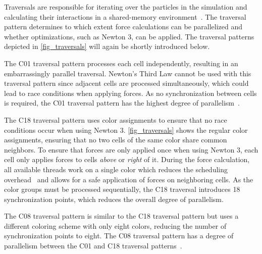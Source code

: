\documentclass[conference]{IEEEtran}
\begin{document}
\begin{description}[style=nextline]
    \item[Traversal]
        Traversals are responsible for iterating over the particles in the simulation and calculating their interactions in a shared-memory environment~\cite{SECKLER2021101296}. The traversal pattern determines to which extent force calculations can be parallelized and whether optimizations, such as Newton 3, can be applied. The traversal patterns depicted in \autoref{fig_traversals} will again be shortly introduced below.

        \begin{description}[style=nextline, font=\itshape\mdseries]
            \item[$\bullet$ C01]
                The C01 traversal pattern processes each cell independently, resulting in an embarrassingly parallel traversal. Newton's Third Law cannot be used with this traversal pattern since adjacent cells are processed simultaneously, which could lead to race conditions when applying forces. As no synchronization between cells is required, the C01 traversal pattern has the highest degree of parallelism~\cite{NEWCOME2023115278}.
            \item[$\bullet$ C18]
                The C18 traversal pattern uses color assignments to ensure that no race conditions occur when using Newton 3. \autoref{fig_traversals} shows the regular color assignments, ensuring that no two cells of the same color share common neighbors. To ensure that forces are only applied once when using Newton 3, each cell only applies forces to cells \textit{above} or \textit{right} of it. During the force calculation, all available threads work on a single color which reduces the scheduling overhead~\cite{NEWCOME2023115278} and allows for a safe application of forces on neighboring cells. As the color groups must be processed sequentially, the C18 traversal introduces 18 synchronization points, which reduces the overall degree of parallelism\cite{NEWCOME2023115278}.

            \item[$\bullet$ C08]
                The C08 traversal pattern is similar to the C18 traversal pattern but uses a different coloring scheme with only eight colors, reducing the number of synchronization points to eight. The C08 traversal pattern has a degree of parallelism between the C01 and C18 traversal patterns~\cite{NEWCOME2023115278}.
        \end{description}


\end{description}
\end{document}
